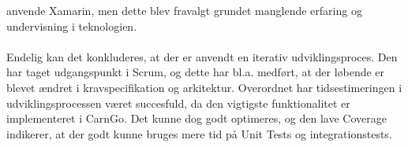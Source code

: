\documentclass[Rapport/Rapport_main.tex]{subfiles}
\begin{document}
anvende Xamarin, men dette blev fravalgt grundet manglende erfaring og undervisning i teknologien.\\\\Endelig kan det konkluderes, at der er anvendt en iterativ udviklingsproces. Den har taget udgangspunkt i Scrum, og dette har bl.a. medført, at der løbende er blevet ændret i kravspecifikation og arkitektur. Overordnet har tidsestimeringen i udviklingsprocessen været succesfuld, da den vigtigste funktionalitet er implementeret i CarnGo. Det kunne dog godt optimeres, og den lave Coverage indikerer, at der godt kunne bruges mere tid på Unit Tests og integrationstests.
\end{document}
